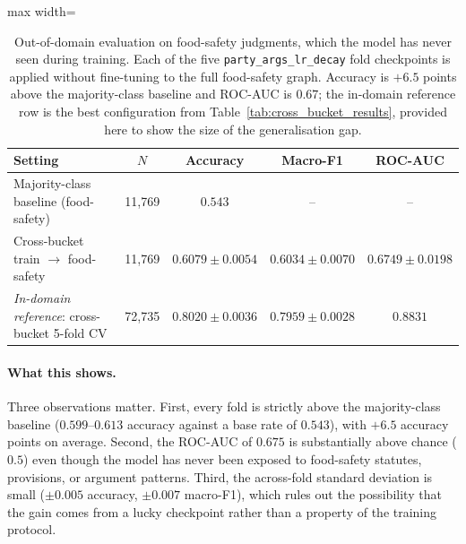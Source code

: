 \begin{table}[H]
  \centering
  \small
  \begin{adjustbox}{max width=\textwidth}
  \begin{tabular}{lcccc}
    \toprule
    Setting & $N$ & Accuracy & Macro-F1 & ROC-AUC \\
    \midrule
    Majority-class baseline (food-safety) & 11{,}769 & $0.543$ & -- & -- \\
    Cross-bucket train $\to$ food-safety  & 11{,}769 & $0.6079\pm0.0054$ & $0.6034\pm0.0070$ & $0.6749\pm0.0198$ \\
    \midrule
    \emph{In-domain reference}: cross-bucket 5-fold CV
      & 72{,}735 & $0.8020\pm0.0036$ & $0.7959\pm0.0028$ & $0.8831$ \\
    \bottomrule
  \end{tabular}
  \end{adjustbox}
  \caption{Out-of-domain evaluation on food-safety judgments, which
  the model has never seen during training.  Each of the five
  \texttt{party\_args\_lr\_decay} fold checkpoints is applied without
  fine-tuning to the full food-safety graph.  Accuracy is $+6.5$
  points above the majority-class baseline and ROC-AUC is $0.67$;
  the in-domain reference row is the best configuration from
  Table~\ref{tab:cross_bucket_results}, provided here to show the
  size of the generalisation gap.}
  \label{tab:cross_domain_food_safety}
\end{table}

\paragraph{What this shows.}
Three observations matter.  First, every fold is strictly above the
majority-class baseline ($0.599$--$0.613$ accuracy against a
base rate of $0.543$), with $+6.5$ accuracy points on average.
Second, the ROC-AUC of $0.675$ is substantially above chance
($0.5$) even though the model has never been exposed to food-safety
statutes, provisions, or argument patterns.  Third, the across-fold
standard deviation is small
($\pm 0.005$ accuracy, $\pm 0.007$ macro-F1), which rules out the
possibility that the gain comes from a lucky checkpoint rather than
a property of the training protocol.

